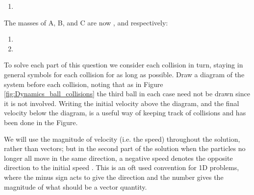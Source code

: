 
\begin{problem}[A1969AMIIQ8l] %
{
\begin{enumerate}
	\item {}
\end{enumerate}
The masses of A, B, and C are now ,  and  respectively:
\begin{enumerate}[resume]
	\item {}
	\item {}
\end{enumerate}

{}
{To solve each part of this question we consider each collision in turn, staying in general symbols for each collision for as long as possible. Draw a diagram of the system before each collision, noting that as in Figure \ref{fig:Dynamics_ball_collisions} the third ball in each case need not be drawn since it is not involved. Writing the initial velocity above the diagram, and the final velocity below the diagram, is a useful way of keeping track of collisions and has been done in the Figure. 

We will use the magnitude of velocity (i.e. the speed) throughout the solution, rather than vectors; but in the second part of the solution when the particles no longer all move in the same direction, a negative speed denotes the opposite direction to the initial speed . This is an oft used convention for 1D problems, where the minus sign acts to give the direction and the number gives the magnitude of what should be a vector quantity.

}}
\end{problem}
